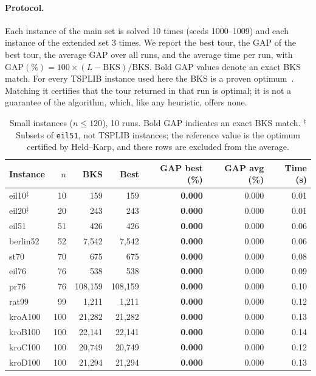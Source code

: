 \documentclass[runningheads]{llncs}
\begin{document}
\paragraph{Protocol.} Each instance of the main set is solved 10 times
(seeds 1000--1009) and each instance of the extended set 3 times. We
report the best tour, the GAP of the best tour, the average GAP over all
runs, and the average time per run, with
GAP$(\%)=100\times(L-\text{BKS})/\text{BKS}$. Bold GAP values denote an
exact BKS match. For every TSPLIB instance used here the BKS is a proven
optimum~\cite{reinelt1991tsplib,applegate2006tsp}. Matching it certifies
that the tour returned in that run is optimal; it is not a guarantee of
the algorithm, which, like any heuristic, offers none.

\begin{table}
\caption{Small instances ($n\le 120$), 10 runs. Bold GAP indicates an
exact BKS match. $^{\ddagger}$Subsets of \texttt{eil51}, not TSPLIB
instances; the reference value is the optimum certified by Held--Karp,
and these rows are excluded from the average.}
\label{tab:small}
\centering\scriptsize
\begin{tabular}{@{}lrrrrrr@{}}
\toprule
\textbf{Instance} & $n$ & \textbf{BKS} & \textbf{Best} & \textbf{GAP best (\%)} & \textbf{GAP avg (\%)} & \textbf{Time (s)}\\
\midrule
eil10$^{\ddagger}$ & 10 & 159 & 159 & \textbf{0.000} & 0.000 & 0.01 \\
eil20$^{\ddagger}$ & 20 & 243 & 243 & \textbf{0.000} & 0.000 & 0.01 \\
eil51 & 51 & 426 & 426 & \textbf{0.000} & 0.000 & 0.06 \\
berlin52 & 52 & 7{,}542 & 7{,}542 & \textbf{0.000} & 0.000 & 0.06 \\
st70 & 70 & 675 & 675 & \textbf{0.000} & 0.000 & 0.08 \\
eil76 & 76 & 538 & 538 & \textbf{0.000} & 0.000 & 0.09 \\
pr76 & 76 & 108{,}159 & 108{,}159 & \textbf{0.000} & 0.000 & 0.10 \\
rat99 & 99 & 1{,}211 & 1{,}211 & \textbf{0.000} & 0.000 & 0.12 \\
kroA100 & 100 & 21{,}282 & 21{,}282 & \textbf{0.000} & 0.000 & 0.13 \\
kroB100 & 100 & 22{,}141 & 22{,}141 & \textbf{0.000} & 0.000 & 0.14 \\
kroC100 & 100 & 20{,}749 & 20{,}749 & \textbf{0.000} & 0.000 & 0.12 \\
kroD100 & 100 & 21{,}294 & 21{,}294 & \textbf{0.000} & 0.000 & 0.13 \\

\end{tabular}
\end{table}
\end{document}
